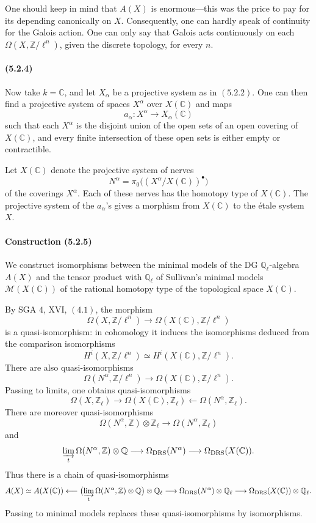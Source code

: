 \documentclass[11pt]{article}
\theoremstyle{remark}
\newcommand{\Ql}{\mathbb{Q}_\ell}
\newcommand{\ZZ}{\mathbb{Z}}
\newcommand{\QQ}{\mathbb{Q}}
\newcommand{\CC}{\mathbb{C}}
\begin{document}
One should keep in mind that \(A(X)\) is enormous---this was the price to pay for its depending canonically on \(X\).  Consequently, one can hardly speak of continuity for the Galois action.  One can only say that Galois acts continuously on each \(\Omega(X,\ZZ/\ell^n)\), given the discrete topology, for every \(n\).

\paragraph{(5.2.4)}
Now take \(k=\CC\), and let \(X_\alpha\) be a projective system as in \((5.2.2)\).  One can then find a projective system of spaces \(X^\alpha\) over \(X(\CC)\) and maps
\[
a_\alpha:X^\alpha\longrightarrow X_\alpha(\CC)
\]
such that each \(X^\alpha\) is the disjoint union of the open sets of an open covering of \(X(\CC)\), and every finite intersection of these open sets is either empty or contractible.

Let \(X(\CC)\) denote the projective system of nerves
\[
N^\alpha=\pi_0\bigl((X^\alpha/X(\CC))^\bullet\bigr)
\]
of the coverings \(X^\alpha\).  Each of these nerves has the homotopy type of \(X(\CC)\).  The projective system of the \(a_\alpha\)'s gives a morphism from \(X(\CC)\) to the étale system \(X\).

\paragraph{Construction (5.2.5)}
We construct isomorphisms between the minimal models of the DG \(\Ql\)-algebra \(A(X)\) and the tensor product with \(\Ql\) of Sullivan's minimal models \(\mathcal M(X(\CC))\) of the rational homotopy type of the topological space \(X(\CC)\).

By SGA \(4\), XVI, \((4.1)\), the morphism
\[
\Omega(X,\ZZ/\ell^n)\longrightarrow \Omega(X(\CC),\ZZ/\ell^n)
\]
is a quasi-isomorphism: in cohomology it induces the isomorphisms deduced from the comparison isomorphisms
\[
H^i(X,\ZZ/\ell^n)\simeq H^i(X(\CC),\ZZ/\ell^n).
\]
There are also quasi-isomorphisms
\[
\Omega(N^\alpha,\ZZ/\ell^n)\longrightarrow \Omega(X(\CC),\ZZ/\ell^n).
\]
Passing to limits, one obtains quasi-isomorphisms
\[
\Omega(X,\ZZ_\ell)\longrightarrow \Omega(X(\CC),\ZZ_\ell)
\longleftarrow \Omega(N^\alpha,\ZZ_\ell).
\]
There are moreover quasi-isomorphisms
\[
\Omega(N^\alpha,\ZZ)\otimes \ZZ_\ell \longrightarrow \Omega(N^\alpha,\ZZ_\ell)
\]
and
\[
\varinjlim_t\Omega(N^\alpha,\ZZ)\otimes\QQ
\longrightarrow
\Omega_{\mathrm{DRS}}(N^\alpha)
\longrightarrow
\Omega_{\mathrm{DRS}}(X(\CC)).
\]
Thus there is a chain of quasi-isomorphisms
\[
A(X)\simeq A(X(\CC))
\longleftarrow
\bigl(\varinjlim_t\Omega(N^\alpha,\ZZ)\otimes\QQ\bigr)\otimes\Ql
\longrightarrow
\Omega_{\mathrm{DRS}}(N^\alpha)\otimes\Ql
\longrightarrow
\Omega_{\mathrm{DRS}}(X(\CC))\otimes\Ql.
\]
Passing to minimal models replaces these quasi-isomorphisms by isomorphisms.
\end{document}
